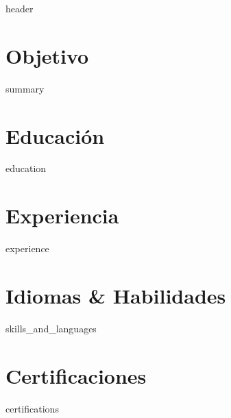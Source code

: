\documentclass[10pt, letterpaper]{article}
\begin{document}
{{ header }}


\section*{Objetivo}
{{ summary }}


\section*{Educación}
{{ education }}


\section*{Experiencia}
{{ experience }}


\section*{Idiomas \& Habilidades}
{{ skills_and_languages }}


\section*{Certificaciones}
{{ certifications }}
\end{document}
